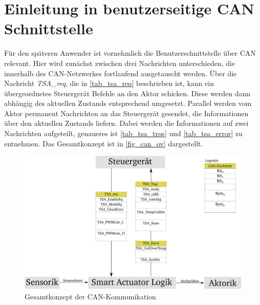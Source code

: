 \section{Einleitung in benutzerseitige CAN Schnittstelle} \label{CANNachrichten}

Für den späteren Anwender ist vornehmlich die Benutzerschnittstelle über CAN relevant. Hier wird zunächst zwischen drei Nachrichten unterschieden, die innerhalb des CAN-Netzwerkes fortlaufend ausgetauscht werden. Über die Nachricht \textit{TSA\_req}, die in \autoref{tab_tsa_req} beschrieben ist, kann ein übergeordnetes Steuergerät Befehle an den Aktor schicken. Diese werden dann abhängig des aktuellen Zustands entsprechend umgesetzt. Parallel werden vom Aktor permanent Nachrichten an das Steuergerät gesendet, die Informationen über den aktuellen Zustands liefern. Dabei werden die Informationen auf zwei Nachrichten aufgeteilt, genaueres ist \autoref{tab_tsa_trqs} und \autoref{tab_tsa_error} zu entnehmen. Das Gesamtkonzept ist in \autoref{fig_can_ov} dargestellt.

\begin{figure}[h]%
\centering
\includegraphics[width=0.6\columnwidth]{./Bilder/fig_can_ov}%
\caption{Gesamtkonzept der CAN-Kommunikation}%
\label{fig_can_ov}%
\end{figure}

